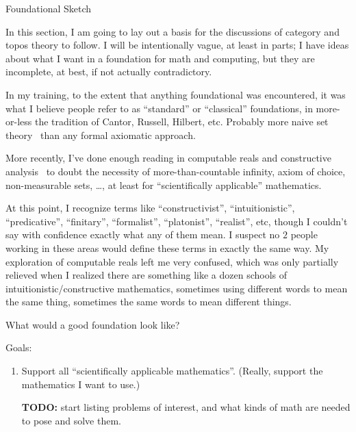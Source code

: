 \begin{plSection}{Foundational Sketch}
\label{sec:Foundational-Sketch}

In this section, I am going to lay out a basis for
the discussions of category and topos theory to follow. 
I will be intentionally vague, at least in parts;
I have ideas about what I want in a foundation 
for math and computing, but they are incomplete, at best,
if not actually contradictory.

In my training, to the extent that anything 
foundational was encountered,
it was what I believe people refer to as ``standard'' or
``classical'' foundations,
in more-or-less the tradition of Cantor, Russell, Hilbert, etc.
Probably more naive set theory~\cite{Halmos:1960:NaiveSetTheory} 
than any formal axiomatic approach.

More recently, I've done enough reading in 
computable reals and constructive 
analysis~\cite{Henle:2012:RealNumbers,Bridger:2019}
to doubt the necessity of more-than-countable infinity,
axiom of choice, non-measurable sets, {\ldots},
at least for ``scientifically applicable'' 
mathematics.~\cite{Feferman:1989:IsCantorNecessary,
Feferman:1992:ALittleBit}

At this point, I recognize terms like
``constructivist'', ``intuitionistic'', ``predicative'', 
``finitary'', ``formalist'', ``platonist'', ``realist'', etc,
though I couldn't say with confidence exactly what any of them
mean. 
I suspect no $2$ people working in these areas would define these
terms in exactly the same way.
My exploration of computable reals left me very confused,
which was only partially relieved when I realized there are 
something like a dozen schools of intuitionistic/constructive
mathematics, sometimes using different words to mean the
same thing, sometimes the same words to mean different things.

\begin{plSection}{What would a good foundation look like?}
\label{sec:good-foundation}

Goals:
\begin{enumerate}
  \item Support all ``scientifically applicable mathematics''.
  (Really, support the mathematics I want to use.) \par
  \textbf{TODO:} start listing problems of interest,
  and what kinds of math are needed to pose and solve them.
  

\end{enumerate}
\end{plSection}
\end{plSection}
